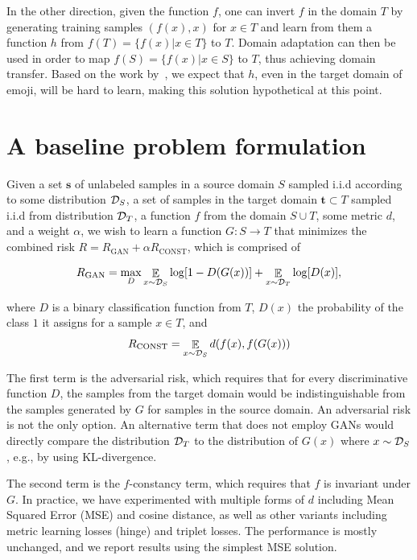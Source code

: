 \documentclass{article} %
\DeclareMathOperator{\E}{\mathbb{E}}
\begin{document}
In the other direction, given the function $f$, one can invert $f$ in the domain $T$ by generating training samples $(f(x),x)$ for $x\in T$ and learn from them a function $h$ from $f(T) = \{f(x) | x\in T\}$ to $T$. Domain adaptation can then be used in order to map $f(S) = \{f(x) | x\in S\}$ to $T$, thus achieving domain transfer.  Based on the work by~\citet{googlesomething}, we expect that $h$, even in the target domain of emoji, will be hard to learn, making this solution hypothetical at this point.

\section{A baseline problem formulation}
\label{sec:baseline}

Given a set $\mathbf{s}$ of unlabeled samples in a source domain $S$ sampled i.i.d according to some distribution ${\cal D}_S$, a set of samples in the target domain $\mathbf{t} \subset T$ sampled i.i.d from distribution ${\cal D}_T$, a function $f$ from the domain $S \cup T$, some metric $d$, and a weight $\alpha$, we wish to learn a function $G:S \rightarrow T$ that minimizes the combined risk $R = R_{\text{GAN}} + \alpha R_{\text{CONST}}$, which is comprised of

\begin{equation}
R_{\text{GAN}} = \max_D \E_{x \sim {\cal D}_S} \log [1-D(G(x))] + \E_{x \sim {\cal D}_T} \log [D(x)], 
\end{equation}

where $D$ is a binary classification function from $T$, $D(x)$ the probability of the class $1$ it assigns for a sample $x \in T$,  and 
\begin{equation}
R_{\text{CONST}} = \E_{x \sim {\cal D}_S} d(f(x),f(G(x)))
\end{equation}

The first term is the adversarial risk, which requires that for every discriminative function $D$, the samples from the target domain would be indistinguishable from the samples generated by $G$ for samples in the source domain. An adversarial risk is not the only option. An alternative term that does not employ GANs would directly compare the distribution ${\cal D}_T$ to the distribution  of $G(x)$ where $x\sim {\cal D}_S$, e.g., by using KL-divergence.

The second term is the $f$-constancy term, which requires that $f$ is invariant under $G$. In practice, we have experimented with multiple forms of $d$ including Mean Squared Error (MSE) and cosine distance, as well as other variants including metric learning losses (hinge) and triplet losses. The performance is mostly unchanged, and we report results using the simplest MSE solution.
\end{document}
